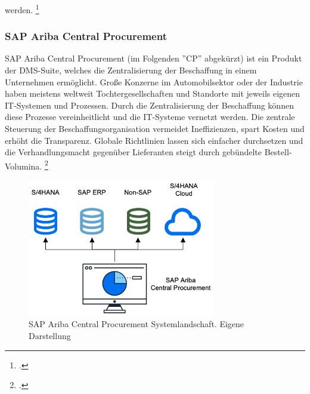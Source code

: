 werden. \footcite[Vgl.][]{theorie_sap_contract_price_renegotiation_2024}

\subsubsection{SAP Ariba Central Procurement}

SAP Ariba Central Procurement (im Folgenden ''CP'' abgekürzt) ist ein Produkt der DMS-Suite, welches die Zentralisierung der Beschaffung in einem Unternehmen ermöglicht. Gro\ss e Konzerne im Automobilsektor oder der Industrie haben meistens weltweit Tochtergesellschaften und Standorte mit jeweils eigenen IT-Systemen und Prozessen. Durch die Zentralisierung der Beschaffung können diese Prozesse vereinheitlicht und die IT-Systeme vernetzt werden. Die zentrale Steuerung der Beschaffungsorganisation vermeidet Ineffizienzen, spart Kosten und erhöht die Transparenz. Globale Richtlinien lassen sich einfacher durchsetzen und die Verhandlungsmacht gegenüber Lieferanten steigt durch gebündelte Bestell-Volumina. \footcite[Vgl.][]{theorie_sap_central_procurement_overview_2024}

\begin{figure}[H]
    \centering
    \includegraphics[height=6cm]{Bilder/Central_Procurement_System_Landscape.png}
    \caption[SAP Ariba Central Procurement Systemlandschaft]{SAP Ariba Central Procurement Systemlandschaft. Eigene Darstellung}
    \label{fig:Central_Procurement_System_Landscape}
\end{figure}

